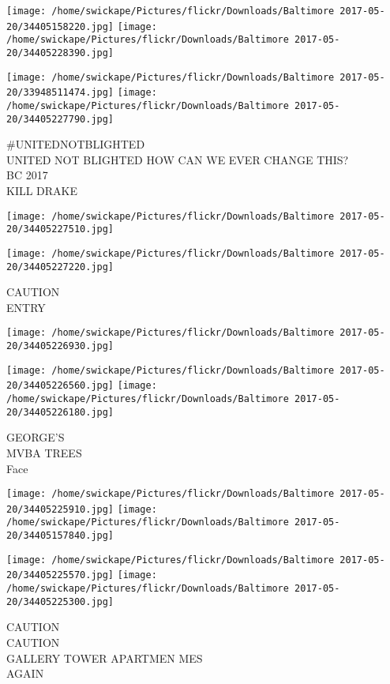 \documentclass[10pt,letterpaper]{article}
\begin{document}
\texttt{[image: /home/swickape/Pictures/flickr/Downloads/Baltimore 2017-05-20/34405158220.jpg]}
\texttt{[image: /home/swickape/Pictures/flickr/Downloads/Baltimore 2017-05-20/34405228390.jpg]}

\texttt{[image: /home/swickape/Pictures/flickr/Downloads/Baltimore 2017-05-20/33948511474.jpg]}
\texttt{[image: /home/swickape/Pictures/flickr/Downloads/Baltimore 2017-05-20/34405227790.jpg]}

\#UNITEDNOTBLIGHTED\\
UNITED NOT BLIGHTED HOW CAN WE EVER CHANGE THIS?\\
BC 2017\\
KILL DRAKE
\pagebreak

\texttt{[image: /home/swickape/Pictures/flickr/Downloads/Baltimore 2017-05-20/34405227510.jpg]}

\vspace{0.25in}
\texttt{[image: /home/swickape/Pictures/flickr/Downloads/Baltimore 2017-05-20/34405227220.jpg]}

CAUTION\\
ENTRY
\pagebreak

\texttt{[image: /home/swickape/Pictures/flickr/Downloads/Baltimore 2017-05-20/34405226930.jpg]}

\vspace{0.25in}
\texttt{[image: /home/swickape/Pictures/flickr/Downloads/Baltimore 2017-05-20/34405226560.jpg]}
\texttt{[image: /home/swickape/Pictures/flickr/Downloads/Baltimore 2017-05-20/34405226180.jpg]}

GEORGE'S\\
MVBA TREES\\
Face
\pagebreak

\texttt{[image: /home/swickape/Pictures/flickr/Downloads/Baltimore 2017-05-20/34405225910.jpg]}
\texttt{[image: /home/swickape/Pictures/flickr/Downloads/Baltimore 2017-05-20/34405157840.jpg]}

\texttt{[image: /home/swickape/Pictures/flickr/Downloads/Baltimore 2017-05-20/34405225570.jpg]}
\texttt{[image: /home/swickape/Pictures/flickr/Downloads/Baltimore 2017-05-20/34405225300.jpg]}

CAUTION\\
CAUTION\\
GALLERY TOWER APARTMEN MES\\
AGAIN
\pagebreak
\end{document}
